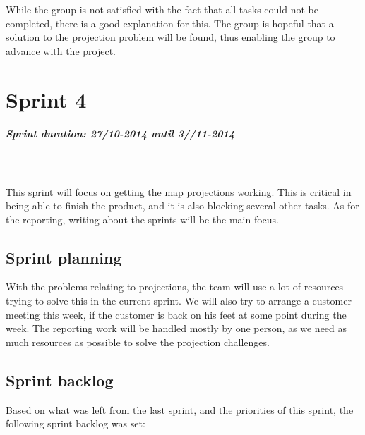 \documentclass[11pt,a4paper,titlepage,oneside]{report}
\begin{document}
While the group is not satisfied with the fact that all tasks could not be completed, there is a good explanation for this. The group is hopeful that a solution to the projection problem will be found, thus enabling the group to advance with the project. 

\chapter{Sprint 4}
\paragraph{Sprint duration: 27/10-2014 until 3//11-2014} \hfill \\
\\
\noindent
This sprint will focus on getting the map projections working. This is critical in being able to finish the product, and it is also blocking several other tasks. As for the reporting, writing about the sprints will be the main focus. 

\section{Sprint planning}
With the problems relating to projections, the team will use a lot of resources trying to solve this in the current sprint. We will also try to arrange a customer meeting this week, if the customer is back on his feet at some point during the week. The reporting work will be handled mostly by one person, as we need as much resources as possible to solve the projection challenges. 
\section{Sprint backlog}
Based on what was left from the last sprint, and the priorities of this sprint, the following sprint backlog was set:
\end{document}
